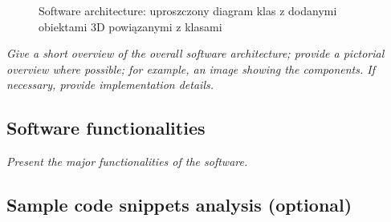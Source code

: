 \begin{figure}

\caption{Software architecture: uproszczony diagram klas z dodanymi obiektami 3D powiązanymi z klasami}
\label{Fig:softwareArchitecture}
\end{figure}



\textit{  Give a short overview of the overall software architecture; provide a pictorial overview where possible; for example, an image showing the components. If necessary, provide implementation details.}

 \subsection{Software functionalities}
\textit{  Present the major functionalities of the software.}

 \subsection{Sample code snippets analysis (optional)}

